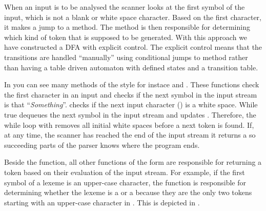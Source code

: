 When an input is to be analysed the scanner looks at the first symbol
of the input, which is not a blank or white space character. Based on
the first character, it makes a jump to a method. The method is
then responsible for determining which kind of token that is supposed to
be generated. With this approach we have constructed a DFA with explicit
control. The explicit control means that the transitions are handled
``manually'' using conditional jumps to method rather than having
a table driven automaton with defined states and a transition table.

In  you can see many methods of the style
 for instace 
and . These functions check the first character
in an input and checks if the next symbol in the input stream is
that ``\textit{Something}''.  checks if
the next input character () is a white space.
While true  dequeues the next symbol in the input
stream and updates . Therefore, the while loop with
 removes all initial white spaces before a
next token is found. If, at any time, the scanner has reached the end of
the input stream it returns a  so succeeding parts of the
parser knows where the program ends.

Beside the  function, all other functions
of the form  are responsible for
returning a token based on their evaluation of the input stream.
For example, if the first symbol of a lexeme is an upper-case
character, the function  is responsible
for determining whether the lexeme is a  or a
 because they are the only two tokens starting
with an upper-case character in \productname{}. This is depicted in
.


